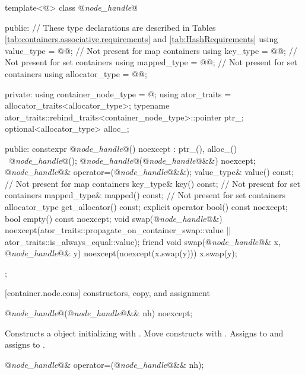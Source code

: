 \begin{codeblock}
template<@\unspecnc@>
class @\textit{node_handle}@ {
public:
  // These type declarations are described in Tables \ref{tab:containers.associative.requirements} and \ref{tab:HashRequirements}
  using value_type     = @\seebelownc{}@; // Not present for map containers
  using key_type       = @\seebelownc{}@; // Not present for set containers
  using mapped_type    = @\seebelownc{}@; // Not present for set containers
  using allocator_type = @\seebelownc{}@;

private:
  using container_node_type = @\unspecnc@;
  using ator_traits         = allocator_traits<allocator_type>;
  typename ator_traits::rebind_traits<container_node_type>::pointer ptr_;
  optional<allocator_type> alloc_;

public:
  constexpr @\textit{node_handle}@() noexcept : ptr_(), alloc_() {}
  ~@\textit{node_handle}@();
  @\textit{node_handle}@(@\textit{node_handle}@&&) noexcept;
  @\textit{node_handle}@& operator=(@\textit{node_handle}@&&);
  value_type& value() const;    // Not present for map containers
  key_type& key() const;        // Not present for set containers
  mapped_type& mapped() const;  // Not present for set containers
  allocator_type get_allocator() const;
  explicit operator bool() const noexcept;
  bool empty() const noexcept;
  void swap(@\textit{node_handle}@&)
    noexcept(ator_traits::propagate_on_container_swap::value ||
             ator_traits::is_always_equal::value);
  friend void swap(@\textit{node_handle}@& x, @\textit{node_handle}@& y) noexcept(noexcept(x.swap(y)))
    { x.swap(y); }
};
\end{codeblock}

[container.node.cons]{ constructors, copy, and assignment}

\begin{itemdecl}
@\textit{node_handle}@(@\textit{node_handle}@&& nh) noexcept;
\end{itemdecl}

\begin{itemdescr}
\pnum
\effects Constructs a  object initializing
 with .  Move constructs  with
.  Assigns  to  and assigns
 to .
\end{itemdescr}

\begin{itemdecl}
@\textit{node_handle}@& operator=(@\textit{node_handle}@&& nh);
\end{itemdecl}

